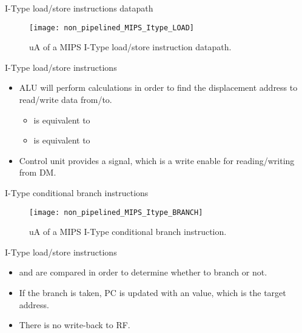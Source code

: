 % 
\begin{frame}{I-Type load/store instructions datapath}
  \begin{figure}
  \centering
  \texttt{[image: non\_pipelined\_MIPS\_Itype\_LOAD]}
  \vspace{-3pt}
  \caption{\ac{uA} of a \ac{MIPS} I-Type load/store instruction datapath.}
  \label{Figure:non_pipelined_MIPS_Itype_LOAD}
  \end{figure}
\end{frame}

% 
\begin{frame}{I-Type load/store instructions}
\begin{itemize}
\item \ac{ALU} will perform calculations in order to find the displacement address to read/write data from/to.
\begin{itemize}
\item {} is equivalent to 
\item {} is equivalent to 
\end{itemize}
\item Control unit provides a  signal, which is a write enable for reading/writing from \ac{DM}.
\end{itemize}
\end{frame}

% 
\begin{frame}{I-Type conditional branch instructions}
  \begin{figure}
  \centering
  \texttt{[image: non\_pipelined\_MIPS\_Itype\_BRANCH]}
  \vspace{-3pt}
  \caption{\ac{uA} of a \ac{MIPS} I-Type conditional branch instruction.}
  \label{Figure:non_pipelined_MIPS_Itype_BRANCH}
  \end{figure}
\end{frame}

%
\begin{frame}{I-Type load/store instructions}
\begin{itemize}
\item {} and  are compared in order to determine whether to branch or not.
\item If the branch is taken, \ac{PC} is updated with an  value, which is the target address.
\item There is no write-back to \ac{RF}.
\end{itemize}
\end{frame}

